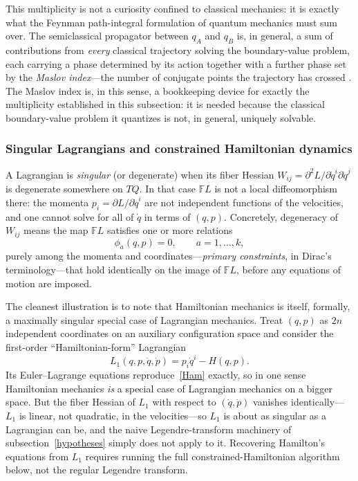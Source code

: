 This multiplicity is not a curiosity confined to classical mechanics: it is
exactly what the Feynman path-integral formulation of quantum mechanics must
sum over. The semiclassical propagator between $q_A$ and $q_B$ is, in general,
a sum of contributions from \emph{every} classical trajectory solving the
boundary-value problem, each carrying a phase determined by its action together
with a further phase set by the \emph{Maslov index}---the number of conjugate
points the trajectory has crossed \cite{gray2009}. The Maslov index is, in
this sense, a bookkeeping device for exactly the multiplicity established in
this subsection: it is needed because the classical boundary-value problem it
quantizes is not, in general, uniquely solvable.

\subsubsection{Singular Lagrangians and constrained Hamiltonian dynamics}
\label{singular}

A Lagrangian is \emph{singular} (or degenerate) when its fiber Hessian $W_{ij}
= \partial^2 L/\partial \dot q^i \partial \dot q^j$ is degenerate somewhere on
$TQ$. In that case $\mathbb{F}L$ is not a local diffeomorphism there: the
momenta $p_i = \partial L/\partial \dot q^i$ are not independent functions of
the velocities, and one cannot solve for all of $\dot q$ in terms of $(q,p)$.
Concretely, degeneracy of $W_{ij}$ means the map $\mathbb{F}L$ satisfies one or
more relations
\begin{equation}
\phi_a(q,p) = 0, \qquad a = 1,\dots,k,
\end{equation}
purely among the momenta and coordinates---\emph{primary constraints}, in
Dirac's terminology---that hold identically on the image of $\mathbb{F}L$,
before any equations of motion are imposed.

The cleanest illustration is to note that Hamiltonian mechanics is itself,
formally, a maximally singular special case of Lagrangian mechanics. Treat
$(q,p)$ as $2n$ independent coordinates on an auxiliary configuration space and
consider the first-order ``Hamiltonian-form'' Lagrangian
\begin{equation}
L_1(q,p,\dot q,\dot p) = p_i \dot q^i - H(q,p).
\end{equation}
Its Euler--Lagrange equations reproduce~\eqref{Ham} exactly, so in one sense
Hamiltonian mechanics \emph{is} a special case of Lagrangian mechanics on a
bigger space. But the fiber Hessian of $L_1$ with respect to $(\dot q,\dot p)$
vanishes identically---$L_1$ is linear, not quadratic, in the velocities---so
$L_1$ is about as singular as a Lagrangian can be, and the naive
Legendre-transform machinery of subsection~\ref{hypotheses} simply does not
apply to it. Recovering Hamilton's equations from $L_1$ requires running the
full constrained-Hamiltonian algorithm below, not the regular Legendre
transform.

